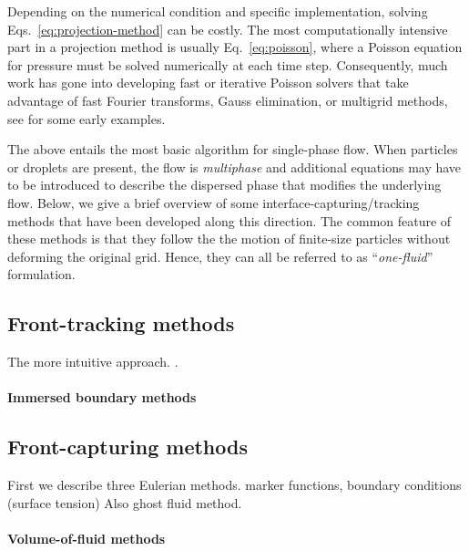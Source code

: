 Depending on the numerical condition and specific implementation, solving Eqs.\ \eqref{eq:projection-method} can be costly. The most computationally intensive part in a projection method is usually Eq.\ \eqref{eq:poisson}, where a Poisson equation for pressure must be solved numerically at each time step. Consequently, much work has gone into developing fast or iterative Poisson solvers that take advantage of fast Fourier transforms, Gauss elimination, or multigrid methods, see \cite{Buzbee_Golub_Nielson, Swarztrauber1977, multigrid_Brandt, Wesseling} for some early examples.

The above entails the most basic algorithm for single-phase flow.
When particles or droplets are present, the flow is \emph{multiphase} and additional equations may have to be introduced to describe the dispersed phase that modifies the underlying flow.
Below, we give a brief overview of some interface-capturing/tracking methods that have been developed along this direction.
The common feature of these methods is that they follow the the motion of finite-size particles without deforming the original grid.
Hence, they can all be referred to as ``\emph{one-fluid}'' formulation.


\subsection{Front-tracking methods}

The more intuitive approach.
\cite{unverdi_tryggvason_1992a}.

\medskip
\paragraph{\bf Immersed boundary methods}

\cite{mittal_iaccarino_2005a, Wim-Paul_JCP_2012}


\subsection{Front-capturing methods}

First we describe three Eulerian methods.
marker functions, boundary conditions (surface tension) \citep{Brackbill_JCP_1992}
Also ghost fluid method.

\medskip
\paragraph{\bf Volume-of-fluid methods}

